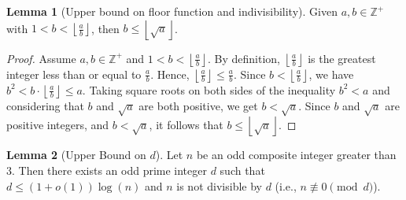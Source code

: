 \documentclass{article}
\theoremstyle{plain}
\theoremstyle{definition}
\newtheorem{lemma}{Lemma}
\newcommand{\Z}{\mathbb{Z}}
\begin{document}
\begin{lemma}[Upper bound on floor function and indivisibility]
\label{lemma:floornondivisorupperbound}
Given $a,b \in \Z^{+}$ with \( 1 < b < \left\lfloor \frac{a}{b} \right\rfloor \), then \(b \leq \left\lfloor \sqrt{a} \right\rfloor\).
\end{lemma}
\begin{proof}
Assume \( a, b \in \Z^{+} \) and \( 1 < b < \left\lfloor \frac{a}{b} \right\rfloor \). By definition, \( \left\lfloor \frac{a}{b} \right\rfloor \) is the greatest integer less than or equal to \( \frac{a}{b} \). Hence, \( \left\lfloor \frac{a}{b} \right\rfloor \leq \frac{a}{b} \). Since \( b < \left\lfloor \frac{a}{b} \right\rfloor \), we have \( b^2 < b \cdot \left\lfloor \frac{a}{b} \right\rfloor \leq a \). Taking square roots on both sides of the inequality \( b^2 < a \) and considering that \( b \) and \( \sqrt{a} \) are both positive, we get \( b < \sqrt{a} \). Since \( b \) and \( \sqrt{a} \) are positive integers, and \( b < \sqrt{a} \), it follows that \( b \leq \left\lfloor \sqrt{a} \right\rfloor \).
\end{proof}

\begin{lemma}[Upper Bound on \( d \)] \label{lemma:leastd}
Let \( n \) be an odd composite integer greater than 3. Then there exists an odd prime integer \( d \) such that \( d \leq (1 + o(1)) \log(n) \) and \( n \) is not divisible by \( d \) (i.e., \( n \not\equiv 0 \pmod{d} \)).
\end{lemma}
\end{document}
